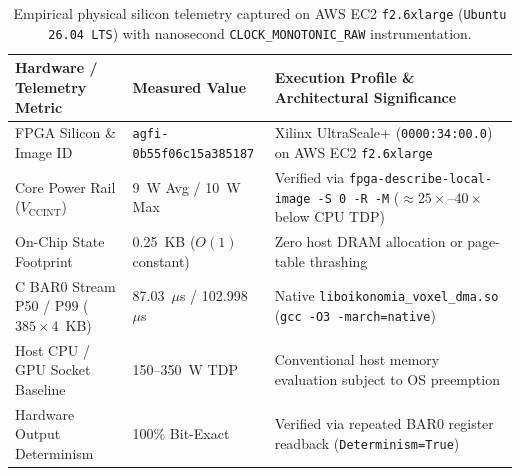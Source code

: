 \documentclass[10pt,letterpaper]{article}
\begin{document}
\begin{table}[h!]
\centering
\footnotesize
\begin{tabularx}{\textwidth}{@{}llX@{}}
\toprule
\textbf{Hardware / Telemetry Metric} & \textbf{Measured Value} & \textbf{Execution Profile \& Architectural Significance} \\
\midrule
FPGA Silicon \& Image ID & \texttt{agfi-0b55f06c15a385187} & Xilinx UltraScale+ (\texttt{0000:34:00.0}) on AWS EC2 \texttt{f2.6xlarge} \\
Core Power Rail ($V_{\text{CCINT}}$) & 9~W Avg / 10~W Max & Verified via \texttt{fpga-describe-local-image -S 0 -R -M} ($\approx 25\times$--$40\times$ below CPU TDP) \\
On-Chip State Footprint & 0.25~KB ($O(1)$ constant) & Zero host DRAM allocation or page-table thrashing \\
C BAR0 Stream P50 / P99 ($385 \times 4$~KB) & 87.03~$\mu$s / 102.998~$\mu$s & Native \texttt{liboikonomia\_voxel\_dma.so} (\texttt{gcc -O3 -march=native}) \\
Host CPU / GPU Socket Baseline & 150--350~W TDP & Conventional host memory evaluation subject to OS preemption \\
Hardware Output Determinism & 100\% Bit-Exact & Verified via repeated BAR0 register readback (\texttt{Determinism=True}) \\
\bottomrule
\end{tabularx}
\caption{Empirical physical silicon telemetry captured on AWS EC2 \texttt{f2.6xlarge} (\texttt{Ubuntu 26.04 LTS}) with nanosecond \texttt{CLOCK\_MONOTONIC\_RAW} instrumentation.}
\end{table}
\end{document}
